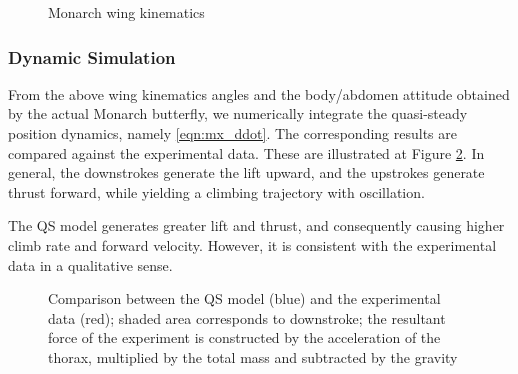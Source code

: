 \documentclass[10pt]{article}
\begin{document}
\begin{figure}
    \centerline{
        \hfill
    }
    \caption{Monarch wing kinematics}\label{fig:Monarch_WK}
\end{figure}

\subsubsection{Dynamic Simulation}

From the above wing kinematics angles and the body/abdomen attitude obtained by the actual Monarch butterfly,
we numerically integrate the quasi-steady position dynamics, namely \eqref{eqn:mx_ddot}.
The corresponding results are compared against the experimental data. 
These are illustrated at Figure \ref{fig:comp_VICON}.
In general, the downstrokes generate the lift upward, and the upstrokes generate thrust forward,
while yielding a climbing trajectory with oscillation.

The QS model generates greater lift and thrust, and consequently causing higher climb rate and forward velocity. 
However, it is consistent with the experimental data in a qualitative sense. 


\begin{figure}[p]
    \centerline{
        \hfill
    }
    \centerline{
        \hfill
    }
    \centerline{
        \hfill
    }
    \caption{Comparison between the QS model (blue) and the experimental data (red); shaded area corresponds to downstroke; the resultant force of the experiment is constructed by the acceleration of the thorax, multiplied by the total mass and subtracted by the gravity}\label{fig:comp_VICON}
\end{figure}
\end{document}
